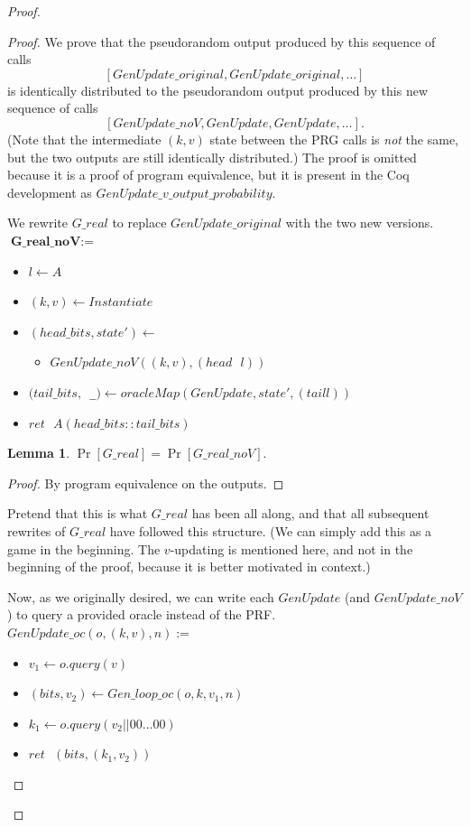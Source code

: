 \documentclass[12pt,lot, lof]{puthesis}
\newenvironment{game}
{ \begin{itemize}[noitemsep,nolistsep] 
}
{ \end{itemize}                  }
\newcommand{\s} {\textrm{ }}
\newcommand{\li} {\lstinline}
\newcommand{\lar}{\leftarrow}
\newtheorem{lem}{Lemma}[thm]
\begin{document}
{\begin{proof}
\begin{proof}
We prove that the pseudorandom output produced by this sequence of calls $$[GenUpdate\_original, GenUpdate\_original, \ldots]$$ is identically distributed to the pseudorandom output produced by this new sequence of calls $$[GenUpdate\_noV, GenUpdate, GenUpdate, \ldots].$$ (Note that the intermediate $(k,v)$ state between the PRG calls is \emph{not} the same, but the two outputs are still identically distributed.) The proof is omitted because it is a proof of program equivalence, but it is present in the Coq development as $GenUpdate\_v\_output\_probability$. 

We rewrite $G\_real$ to replace $GenUpdate\_original$ with the two new versions.\\

$\textbf{G\_real\_noV} := $
\begin{game}
\item[] $l \leftarrow A$
\item[] $(k,v) \leftarrow Instantiate$
\item[] $(head\_bits, state') \lar$
  \begin{game}
    \item[]  $GenUpdate\_noV((k, v), (head \s l))$
  \end{game}
\item[] $(tail\_bits, $\li| _|$) \lar oracleMap(GenUpdate,state',(tail l))$
\item[] $ret \s A(head\_bits :: tail\_bits)$ \\
\end{game}

\begin{lem} $\Pr[G\_real] = \Pr[G\_real\_noV].$ \end{lem}
\begin{proof} By program equivalence on the outputs. \end{proof}

Pretend that this is what $G\_real$ has been all along, and that all subsequent rewrites of $G\_real$ have followed this structure. (We can simply add this as a game in the beginning. The $v$-updating is mentioned here, and not in the beginning of the proof, because it is better motivated in context.) 

Now, as we originally desired, we can write each $GenUpdate$ (and $GenUpdate\_noV$) to query a provided oracle instead of the PRF. \\

$GenUpdate\_oc(o, (k,v), n) :=$
\begin{game}
\item[] $v_1 \lar o.query(v)$
\item[] $(bits, v_2) \lar Gen\_loop\_oc(o, k, v_1, n)$
\item[] $k_1 \lar o.query(v_2 || 00 \ldots 00)$
\item[] $ret \s (bits, (k_1, v_2))$\\
\end{game}


\end{proof}
\end{proof}}
\end{document}

